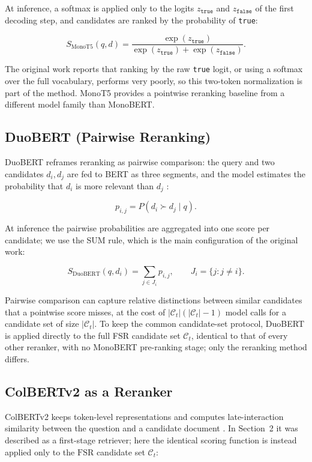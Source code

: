 \documentclass[11pt,a4paper]{article}
\begin{document}
At inference, a softmax is applied only to the logits $z_{\texttt{true}}$ and $z_{\texttt{false}}$ of the first decoding step, and candidates are ranked by the probability of \texttt{true}:

\[
S_{\mathrm{MonoT5}}(q,d)
=
\frac{\exp(z_{\texttt{true}})}{\exp(z_{\texttt{true}})+\exp(z_{\texttt{false}})}.
\]

The original work reports that ranking by the raw \texttt{true} logit, or using a softmax over the full vocabulary, performs very poorly, so this two-token normalization is part of the method. MonoT5 provides a pointwise reranking baseline from a different model family than MonoBERT.

\subsection{DuoBERT (Pairwise Reranking)}

DuoBERT reframes reranking as pairwise comparison: the query and two candidates $d_i,d_j$ are fed to BERT as three segments, and the model estimates the probability that $d_i$ is more relevant than $d_j$ \citep{nogueira-etal-2019-multistage}:

\[
p_{i,j}=P(d_i\succ d_j\mid q).
\]

At inference the pairwise probabilities are aggregated into one score per candidate; we use the SUM rule, which is the main configuration of the original work:

\[
S_{\mathrm{DuoBERT}}(q,d_i)
=
\sum_{j\in J_i}p_{i,j},
\qquad
J_i=\{j:j\neq i\}.
\]

Pairwise comparison can capture relative distinctions between similar candidates that a pointwise score misses, at the cost of $|\mathcal{C}_t|(|\mathcal{C}_t|-1)$ model calls for a candidate set of size $|\mathcal{C}_t|$. To keep the common candidate-set protocol, DuoBERT is applied directly to the full FSR candidate set $\mathcal{C}_t$, identical to that of every other reranker, with no MonoBERT pre-ranking stage; only the reranking method differs.

\subsection{ColBERTv2 as a Reranker}

ColBERTv2 keeps token-level representations and computes late-interaction similarity between the question and a candidate document \citep{santhanam-etal-2022-colbertv2}. In Section~2 it was described as a first-stage retriever; here the identical scoring function is instead applied only to the $\mathrm{FSR}$ candidate set $\mathcal{C}_t$:
\end{document}
